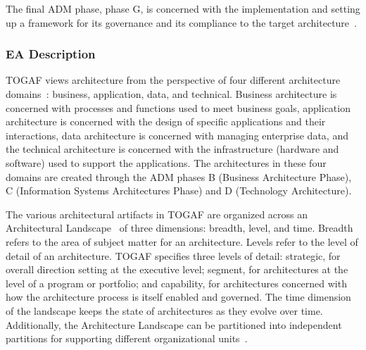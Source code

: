 The final ADM phase, phase G, is concerned with the implementation and setting up a framework for its governance and its compliance to the target architecture~\cite[Ch. 15]{togaf9.1}.

\subsubsection{EA Description}
TOGAF views architecture from the perspective of four different architecture domains~\cite{sessions2007}: business, application, data, and technical. Business architecture is concerned with processes and functions used to meet business goals, application architecture is concerned with the design of specific applications and their interactions, data architecture is concerned with managing enterprise data, and the technical architecture is concerned with the infrastructure (hardware and software) used to support the applications. The architectures in these four domains are created through the ADM phases B (Business Architecture Phase), C (Information Systems Architectures Phase) and D (Technology Architecture).

The various architectural artifacts in TOGAF are organized across an Architectural Landscape~\cite[Ch. 20.2]{togaf9.1} of three dimensions: breadth, level, and time. Breadth refers to the area of subject matter for an architecture. Levels refer to the level of detail of an architecture. TOGAF specifies three levels of detail: strategic, for overall direction setting at the executive level; segment, for architectures at the level of a program or portfolio; and capability, for architectures concerned with how the architecture process is itself enabled and governed. The time dimension of the landscape keeps the state of architectures as they evolve over time. Additionally, the Architecture Landscape can be partitioned into independent partitions for supporting different organizational units~\cite[Ch. 40]{togaf9.1}. 





